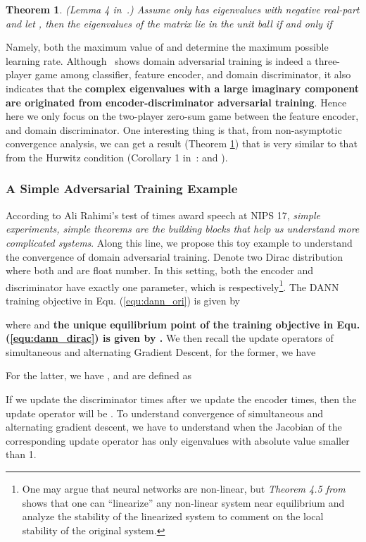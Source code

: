 \documentclass{article} \usepackage{iclr2023_conference,times}
\newtheorem{theo}{Theorem}
\newcommand{\myref}[1]{Equ. (\ref{#1})}
\begin{document}
\begin{theo}
(Lemma 4 in~\citep{mescheder2017numerics}.) Assume  only has eigenvalues with negative real-part and let , then the eigenvalues of the matrix  lie in the unit ball if and only if

\label{theo:convergence2}
\end{theo}
Namely, both the maximum value of  and  determine the maximum possible learning rate. Although~\citep{acuna2021f} shows domain adversarial training is indeed a three-player game among classifier, feature encoder, and domain discriminator, it also indicates that the \textbf{complex eigenvalues with a large imaginary component are originated from encoder-discriminator adversarial training}.  Hence here we only focus on the two-player zero-sum game between the feature encoder, and domain discriminator. One interesting thing is that, from non-asymptotic convergence analysis, we can get a result (Theorem \ref{theo:convergence2}) that is very similar to that from the Hurwitz condition (Corollary 1 in~\citep{acuna2021f}:  and ).


\subsubsection{A Simple Adversarial Training Example}

According to Ali Rahimi's test of times award speech at NIPS 17, \textit{simple experiments, simple theorems are the building blocks that help us understand more complicated systems}. Along this line, we propose this toy example to understand the convergence of domain adversarial training. Denote  two Dirac distribution where both  and  are float number. In this setting, both the encoder and discriminator have exactly one parameter, which is  respectively\footnote{One may argue that neural networks are non-linear, but \textit{Theorem 4.5 from~\citep{nonlinearsystem}} shows that one can “linearize” any non-linear system near equilibrium and analyze the stability of the linearized system to comment on the local stability of the original system.}. The DANN training objective in \myref{equ:dann_ori} is given by

where  and \textbf{the unique equilibrium point of the training objective in \myref{equ:dann_dirac} is given by .} We then recall the update operators of simultaneous and alternating Gradient Descent, for the former, we have 

For the latter, we have , and  are defined as

If we update the discriminator  times after we update the encoder  times, then the update operator will be . To understand convergence of simultaneous and alternating gradient descent, we have to understand when the Jacobian of the corresponding update operator has only eigenvalues with absolute value smaller than 1.
\end{document}
